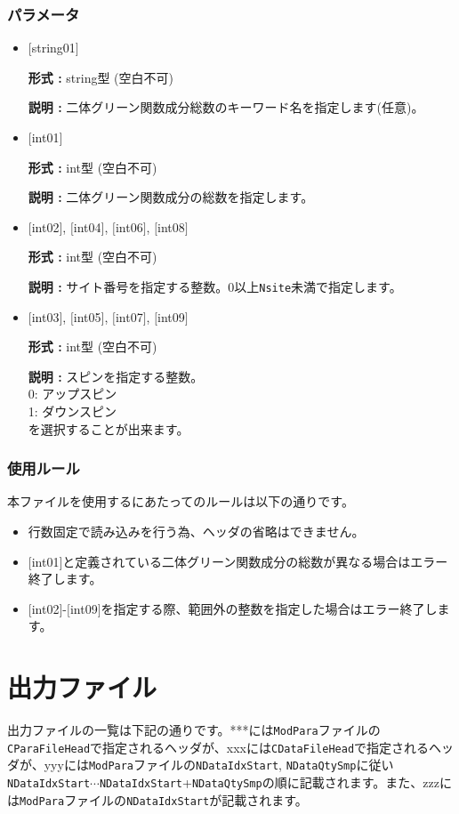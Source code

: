 \subsubsection{パラメータ}
 \begin{itemize}

   \item  $[$string01$]$
   
    {\bf 形式 :} string型 (空白不可)

   {\bf 説明 :} 二体グリーン関数成分総数のキーワード名を指定します(任意)。

   \item  $[$int01$]$
   
    {\bf 形式 :} int型 (空白不可)

   {\bf 説明 :} 二体グリーン関数成分の総数を指定します。

  \item  $[$int02$]$, $[$int04$]$, $[$int06$]$, $[$int08$]$

 {\bf 形式 :} int型 (空白不可)

{\bf 説明 :} サイト番号を指定する整数。0以上\verb|Nsite|{未満}で指定します。
 
  \item  $[$int03$]$, $[$int05$]$, $[$int07$]$, $[$int09$]$

 {\bf 形式 :} int型 (空白不可)

{\bf 説明 :} スピンを指定する整数。\\
0: アップスピン\\
1: ダウンスピン\\
を選択することが出来ます。

\end{itemize}

\subsubsection{使用ルール}
本ファイルを使用するにあたってのルールは以下の通りです。
\begin{itemize}
\item 行数固定で読み込みを行う為、ヘッダの省略はできません。
\item $[$int01$]$と定義されている二体グリーン関数成分の総数が異なる場合はエラー終了します。
\item $[$int02$]$-$[$int09$]$を指定する際、範囲外の整数を指定した場合はエラー終了します。
\end{itemize}

\newpage
\section{出力ファイル}
\label{Sec:outputfile}
出力ファイルの一覧は下記の通りです。***には\verb|ModPara|ファイルの\verb|CParaFileHead|で指定されるヘッダが、xxxには\verb|CDataFileHead|で指定されるヘッダが、yyyには\verb|ModPara|ファイルの\verb|NDataIdxStart|, \verb|NDataQtySmp|に従い\verb|NDataIdxStart|$\cdots$\verb|NDataIdxStart|+\verb|NDataQtySmp|の順に記載されます。また、zzzには\verb|ModPara|ファイルの\verb|NDataIdxStart|が記載されます。

